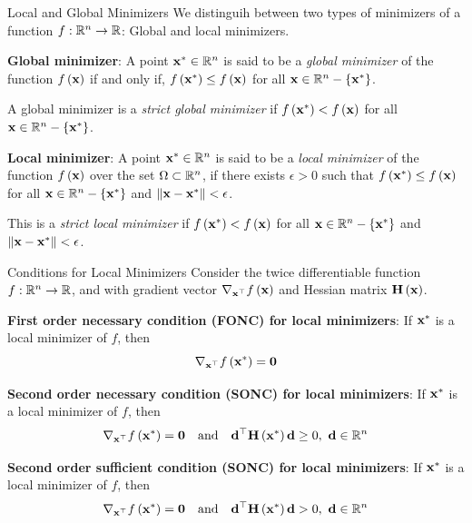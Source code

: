 \documentclass[aspectratio=169]{beamer}
\def\mf{\ensuremath\mathbf}
\def\mb{\ensuremath\mathbb}
\def\lp{\ensuremath\left(}
\def\rp{\ensuremath\right)}
\def\lc{\ensuremath\left\{}
\def\rc{\ensuremath\right\}}
\def\R{\ensuremath\mb{R}}
\newcommand{\ct}[1]{\lp #1\rp}
\begin{document}
\begin{frame}{Local and Global Minimizers}
  We distinguih between two types of minimizers of a function $f :\R^n \to \R$:  Global and local minimizers.
  \vspace{0.25cm}

  \textbf{Global minimizer}: A point $\mf{x}^* \in \R^n$ is said to be a \textit{global minimizer} of the function $f\ct{\mf{x}}$ if and only if, $f\ct{\mf{x}^*} \leq f\ct{\mf{x}}$ for all $\mf{x} \in \R^n - \lc \mf{x}^* \rc$. 
  \vspace{0.25cm}
  
  A global minimizer is a \textit{strict global minimizer} if $f\ct{\mf{x}^*} < f\ct{\mf{x}}$ for all $\mf{x} \in \R^n - \lc \mf{x}^* \rc$.
  \vspace{0.25cm}
  
  \textbf{Local minimizer}: A point $\mf{x}^* \in \R^n$ is said to be a \textit{local minimizer} of the function $f\ct{\mf{x}}$ over the set $\Omega \subset \R^n$, if there exists $\epsilon > 0$ such that $f\ct{\mf{x}^*} \leq f\ct{\mf{x}}$ for all $\mf{x} \in \R^n - \lc \mf{x}^* \rc$ and $\Vert \mf{x} - \mf{x}^*\Vert < \epsilon$. 
  \vspace{0.25cm}

  This is a \textit{strict local minimizer} if $f\ct{\mf{x}^*} < f\ct{\mf{x}}$ for all $\mf{x} \in \R^n - \lc \mf{x}^* \rc$ and $\Vert \mf{x} - \mf{x}^*\Vert < \epsilon$.
\end{frame}


\begin{frame}{Conditions for Local Minimizers}
  Consider the twice differentiable function $f: \R^n \to \R$, and with gradient vector $\nabla_{\mf{x}^\top}f\ct{\mf{x}}$ and Hessian matrix $\mf{H}\ct{\mf{x}}$.
  \vspace{0.1cm}

  \textbf{First order necessary condition (FONC) for local minimizers}:
  If $\mf{x}^*$ is a local minimizer of $f$, then
  \[ \nabla_{\mf{x}^\top}f\ct{\mf{x^*}} = \mf{0} \]

  \textbf{Second order necessary condition (SONC) for local minimizers}:
  If $\mf{x}^*$ is a local minimizer of $f$, then
  \[ \nabla_{\mf{x}^\top}f\ct{\mf{x^*}} = \mf{0} \quad \text{and} \quad \mf{d}^\top\mf{H}\ct{\mf{x}^*}
  \mf{d} \geq 0, \,\, \mf{d} \in \R^n \]

  \textbf{Second order sufficient condition (SONC) for local minimizers}:
  If $\mf{x}^*$ is a local minimizer of $f$, then
  \[ \nabla_{\mf{x}^\top}f\ct{\mf{x^*}} = \mf{0} \quad \text{and} \quad \mf{d}^\top\mf{H}\ct{\mf{x}^*}
  \mf{d} > 0, \,\, \mf{d} \in \R^n \]
\end{frame}
\end{document}
